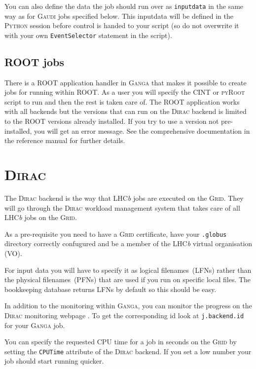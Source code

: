 \documentclass{howto}
\def\ganga {\textsc{Ganga}\xspace}
\def\python {\textsc{Python}\xspace}
\def\root {\textsc{ROOT}\xspace}
\def\lhcb {LHC{\em b\/}\xspace}
\def\gaudi {\textsc{Gaudi}\xspace}
\def\dirac {\textsc{Dirac}\xspace}
\def\grid {\textsc{Grid}\xspace}
\begin{document}
You can also define the data the job should run over as \texttt{inputdata} in
the same way as for \gaudi jobs specified below. This inputdata will be
defined in the \python session before control is handed to your script (so do
not overwrite it with your own \texttt{EventSelector} statement in the
script).


\subsection{\root jobs}
\label{sec:ROOT}
There is a \root application handler in \ganga that makes it possible to
create jobs for running within \root. As a user you will specify the
\textsc{CINT} or \textsc{pyRoot} script to run and then the rest is taken care
of. The \root application works with all backends but the versions that can
run on the \dirac backend is limited to the \root versions already
installed. If you try to use a version not pre-installed, you will get an
error message. See the comprehensive documentation in the reference manual for
further details.

\section{\dirac}
\label{sec:dirac}
The \dirac backend is the way that \lhcb jobs are executed on the \grid. They
will go through the \dirac workload management system that takes care of all
\lhcb jobs on the \grid.
\begin{notice}
  As a pre-requisite you need to have a \grid certificate, have your
  \texttt{.globus} directory correctly confugured and be a member of the \lhcb
  virtual organisation (VO).
\end{notice}
For input data you will have to specify it as logical filenames~(LFNs) rather
than the physical filenames~(PFNs) that are used if you run on specific local
files. The bookkeeping database returns LFNs by default so this should be
easy.
\begin{seealso}
  In addition to the monitoring within \ganga, you can monitor the progress on
  the \dirac monitoring webpage
  . To get the
  corresponding id look at \texttt{j.backend.id} for your \ganga job.
\end{seealso}

You can specify the requested CPU time for a job in seconds on the \grid by
setting the \texttt{CPUTime} attribute of the \dirac backend. If you set a low
number your job should start running quicker.
\end{document}
